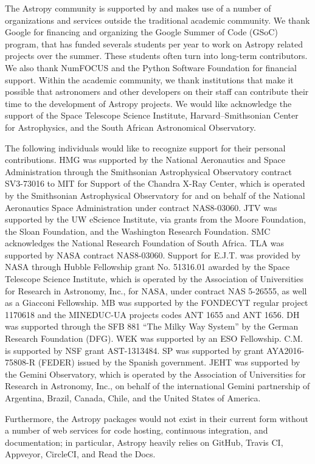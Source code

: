 \documentclass[modern]{aastex62}
\newcommand{\astropy}{Astropy\xspace}
\begin{document}
The \astropy community is supported by and makes use
of a number of organizations and services outside the traditional
academic community. We thank Google for financing and organizing the
Google Summer of Code (GSoC) program, that has funded severals
students per year to work on \astropy related projects over the
summer. These students often turn into long-term contributors. We also
thank NumFOCUS and the Python Software Foundation for financial
support. Within the academic community, we thank
institutions that make it possible that astronomers and other developers on
their staff can contribute their time to the development of
\astropy projects.  We would like acknowledge the support of the
Space Telescope Science Institute, Harvard–Smithsonian Center for Astrophysics,
and the South African Astronomical Observatory.

The following individuals would like to recognize support for their personal contributions.
HMG was supported by the National Aeronautics and Space Administration through the
Smithsonian Astrophysical Observatory contract SV3-73016 to MIT for Support of the Chandra X-Ray Center, which is
operated by the Smithsonian Astrophysical Observatory for and on behalf of the National Aeronautics Space
Administration under contract NAS8-03060. JTV was supported by the UW eScience Institute, via grants from the Moore
Foundation, the Sloan Foundation, and the Washington Research Foundation. SMC acknowledges the National Research
Foundation of South Africa. TLA was supported by NASA contract NAS8-03060. Support for E.J.T. was provided by NASA
through Hubble Fellowship grant No. 51316.01 awarded by the Space Telescope Science Institute, which is operated by
the Association of Universities for Research in Astronomy, Inc., for NASA, under contract NAS 5-26555, as well as a
Giacconi Fellowship. MB was supported by the FONDECYT regular project 1170618 and the MINEDUC-UA projects codes
ANT 1655 and ANT 1656. DH was supported through the SFB 881 ``The
Milky Way System'' by the German Research Foundation
(DFG). WEK was supported by an ESO Fellowship. C.M. is supported by NSF grant AST-1313484. SP was supported by
grant AYA2016-75808-R (FEDER) issued by the Spanish government. JEHT was supported by the Gemini Observatory, which
is operated by the Association of Universities for Research in Astronomy, Inc., on behalf of the international
Gemini partnership of Argentina, Brazil, Canada, Chile, and the United States of America.


Furthermore, the \astropy packages would not exist
in their current form without a number of web services for code
hosting, continuous integration, and documentation; in particular,
\astropy heavily relies on GitHub, Travis CI, Appveyor, CircleCI, and
Read the Docs.
\end{document}
